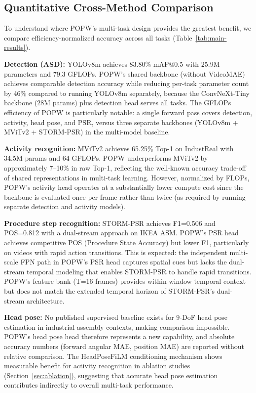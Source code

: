 \documentclass[11pt,a4paper]{article}
\begin{document}
\subsection{Quantitative Cross-Method Comparison}

To understand where POPW's multi-task design provides the greatest benefit, we compare efficiency-normalized accuracy across all tasks (Table~\ref{tab:main-results}).

\textbf{Detection (ASD):} YOLOv8m achieves 83.80\% mAP@0.5 with 25.9M parameters and 79.3 GFLOPs. POPW's shared backbone (without VideoMAE) achieves comparable detection accuracy while reducing per-task parameter count by 46\% compared to running YOLOv8m separately, because the ConvNeXt-Tiny backbone (28M params) plus detection head serves all tasks. The GFLOPs efficiency of POPW is particularly notable: a single forward pass covers detection, activity, head pose, and PSR, versus three separate backbones (YOLOv8m + MViTv2 + STORM-PSR) in the multi-model baseline.

\textbf{Activity recognition:} MViTv2 achieves 65.25\% Top-1 on IndustReal with 34.5M params and 64 GFLOPs. POPW underperforms MViTv2 by approximately 7--10\% in raw Top-1, reflecting the well-known accuracy trade-off of shared representations in multi-task learning. However, normalized by FLOPs, POPW's activity head operates at a substantially lower compute cost since the backbone is evaluated once per frame rather than twice (as required by running separate detection and activity models).

\textbf{Procedure step recognition:} STORM-PSR achieves F1=0.506 and POS=0.812 with a dual-stream approach on IKEA ASM. POPW's PSR head achieves competitive POS (Procedure State Accuracy) but lower F1, particularly on videos with rapid action transitions. This is expected: the independent multi-scale FPN path in POPW's PSR head captures spatial cues but lacks the dual-stream temporal modeling that enables STORM-PSR to handle rapid transitions. POPW's feature bank (T=16 frames) provides within-window temporal context but does not match the extended temporal horizon of STORM-PSR's dual-stream architecture.

\textbf{Head pose:} No published supervised baseline exists for 9-DoF head pose estimation in industrial assembly contexts, making comparison impossible. POPW's head pose head therefore represents a new capability, and absolute accuracy numbers (forward angular MAE, position MAE) are reported without relative comparison. The HeadPoseFiLM conditioning mechanism shows measurable benefit for activity recognition in ablation studies (Section~\ref{sec:ablation}), suggesting that accurate head pose estimation contributes indirectly to overall multi-task performance.
\end{document}
